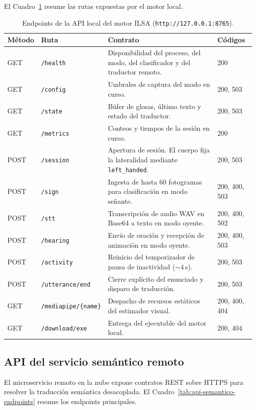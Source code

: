 El Cuadro~\ref{tab:api-ilsa-local} resume las rutas expuestas por el motor local.

\begin{table}[htbp]
  \centering
  \caption{Endpoints de la API local del motor ILSA (\texttt{http://127.0.0.1:8765}).}
  \label{tab:api-ilsa-local}
  \scriptsize
  \begin{tabular}{|p{}|p{}|p{}|p{}|}
    \hline
    \textbf{Método} & \textbf{Ruta} & \textbf{Contrato} & \textbf{Códigos} \\ \hline
    GET & \texttt{/health} & Disponibilidad del proceso, del modo, del clasificador y del traductor remoto. & 200 \\ \hline
    GET & \texttt{/config} & Umbrales de captura del modo en curso. & 200, 503 \\ \hline
    GET & \texttt{/state} & Búfer de glosas, último texto y estado del traductor. & 200, 503 \\ \hline
    GET & \texttt{/metrics} & Conteos y tiempos de la sesión en curso. & 200 \\ \hline
    POST & \texttt{/session} & Apertura de sesión. El cuerpo fija la lateralidad mediante \texttt{left\_handed}. & 200, 503 \\ \hline
    POST & \texttt{/sign} & Ingesta de hasta 60 fotogramas para clasificación en modo señante. & 200, 400, 503 \\ \hline
    POST & \texttt{/stt} & Transcripción de audio WAV en Base64 a texto en modo oyente. & 200, 400, 502 \\ \hline
    POST & \texttt{/hearing} & Envío de oración y recepción de animación en modo oyente. & 200, 400, 503 \\ \hline
    POST & \texttt{/activity} & Reinicio del temporizador de pausa de inactividad ($\sim 4$\,s). & 200, 503 \\ \hline
    POST & \texttt{/utterance/end} & Cierre explícito del enunciado y disparo de traducción. & 200, 503 \\ \hline
    GET & \texttt{/mediapipe/\{name\}} & Despacho de recursos estáticos del estimador visual. & 200, 400, 404 \\ \hline
    GET & \texttt{/download/exe} & Entrega del ejecutable del motor local. & 200, 404 \\ \hline
  \end{tabular}
\end{table}

\subsection{API del servicio semántico remoto}
\label{sec:api-semantico-remoto}
El microservicio remoto en la nube expone contratos REST sobre HTTPS para resolver la traducción semántica desacoplada. El Cuadro~\ref{tab:api-semantico-endpoints} resume los endpoints principales.

